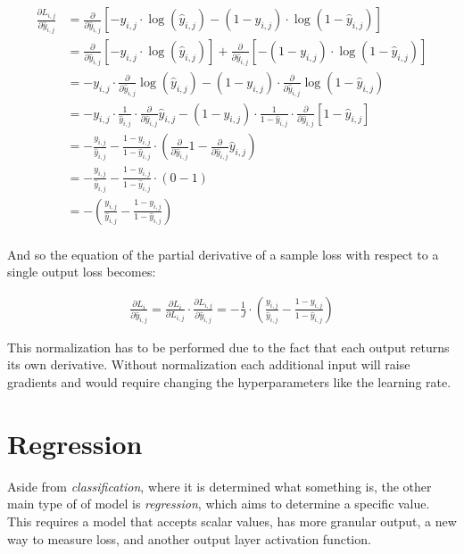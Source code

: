 \documentclass[a4paper]{report}
\begin{document}
\begin{align*}
    \frac{\partial L_{i,j}}{\partial\hat{y}_{i,j}} &= \frac{\partial}{\partial\hat{y}_{i,j}} \left[ -y_{i,j} \cdot \log(\hat{y}_{i,j}) - (1-y_{i,j}) \cdot \log(1-\hat{y}_{i,j}) \right] \\
    &= \frac{\partial}{\partial\hat{y}_{i,j}} \left[ -y_{i,j} \cdot \log(\hat{y}_{i,j}) \right] + \frac{\partial}{\partial\hat{y}_{i,j}} \left[ -(1-y_{i,j}) \cdot \log(1-\hat{y}_{i,j}) \right]\\
    &= -y_{i,j} \cdot \frac{\partial}{\partial\hat{y}_{i,j}} \log(\hat{y}_{i,j}) - (1-y_{i,j}) \cdot \frac{\partial}{\partial\hat{y}_{i,j}} \log(1-\hat{y}_{i,j}) \\
    &= -y_{i,j} \cdot \frac{1}{\hat{y}_{i,j}} \cdot \frac{\partial}{\partial\hat{y}_{i,j}}\hat{y}_{i,j} - (1-y_{i,j}) \cdot \frac{1}{1-\hat{y}_{i,j}} \cdot \frac{\partial}{\partial\hat{y}_{i,j}}[1-\hat{y}_{i,j}] \\
    &= -\frac{y_{i,j}}{\hat{y}_{i,j}} - \frac{1-y_{i,j}}{1-\hat{y}_{i,j}} \cdot \left( \frac{\partial}{\partial\hat{y}_{i,j}}1 - \frac{\partial}{\partial\hat{y}_{i,j}} \hat{y}_{i,j} \right) \\
    &= -\frac{y_{i,j}}{\hat{y}_{i,j}} - \frac{1-y_{i,j}}{1-\hat{y}_{i,j}} \cdot (0-1) \\
    &= - \left( \frac{y_{i,j}}{\hat{y}_{i,j}} - \frac{1-y_{i,j}}{1-\hat{y}_{i,j}} \right) \\
\end{align*}

And so the equation of the partial derivative of a sample loss with respect to a single output loss becomes:

\begin{align*}
    \frac{\partial L_i}{\partial\hat{y}_{i,j}} = \frac{\partial L_i}{\partial L_{i,j}} \cdot \frac{\partial L_{i,j}}{\partial\hat{y}_{i,j}} = -\frac{1}{J} \cdot \left( \frac{y_{i,j}}{\hat{y}_{i,j}} - \frac{1-y_{i,j}}{1-\hat{y}_{i,j}} \right)
\end{align*}

This normalization has to be performed due to the fact that each output returns its own derivative. Without normalization each additional input will raise gradients and would require changing the hyperparameters like the learning rate.

\section{Regression}
Aside from \emph{classification}, where it is determined what something is, the other main type of of model is \emph{regression}, which aims to determine a specific value. This requires a model that accepts scalar values, has more granular output, a new way to measure loss, and another output layer activation function.
\end{document}
